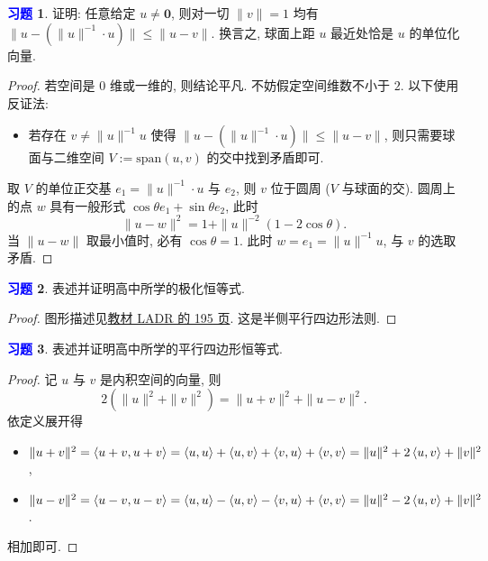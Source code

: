\documentclass[11pt]{ctexart}
\theoremstyle{definition}
\numberwithin{equation}{section}
\theoremstyle{definition}
\newtheorem{exercise}{\textcolor{blue}{习题}}
\theoremstyle{remark}
\begin{document}
\begin{exercise}
    证明: 任意给定 $u\neq \mathbf 0$, 则对一切 $\|v\|=1$ 均有 $\|u-(\|u\|^{-1}\cdot u)\|\leq \|u-v\|$. 换言之, 球面上距 $u$ 最近处恰是 $u$ 的单位化向量.
    \begin{proof}
        若空间是 $0$ 维或一维的, 则结论平凡. 不妨假定空间维数不小于 $2$. 以下使用反证法: 
        \begin{itemize}
            \item 若存在 $v\neq \|u\|^{-1}u$ 使得 $\|u-(\|u\|^{-1}\cdot u)\|\leq \|u-v\|$, 则只需要球面与二维空间 $V:=\mathrm{span}(u,v)$ 的交中找到矛盾即可.  
        \end{itemize}
        取 $V$ 的单位正交基 $e_1=\|u\|^{-1}\cdot u$ 与 $e_2$, 则 $v$ 位于圆周 ($V$ 与球面的交). 圆周上的点 $w$ 具有一般形式 $\cos\theta e_1+\sin \theta e_2$, 此时 
        \begin{equation}
            \|u-w\|^2= 1 + \|u\|^{-2}(1-2\cos\theta). 
        \end{equation}
        当 $\|u-w\|$ 取最小值时, 必有 $\cos\theta =1$. 此时 $w=e_1=\|u\|^{-1}u$, 与 $v$ 的选取矛盾. 
    \end{proof}
\end{exercise}

\begin{exercise}
    表述并证明高中所学的极化恒等式.
    \begin{proof}
        图形描述见\href{https://linear.axler.net/LADR4e.pdf#page=209}{教材 LADR 的 195 页}. 这是半侧平行四边形法则. 
    \end{proof}
\end{exercise}

\begin{exercise}
    表述并证明高中所学的平行四边形恒等式.
    \begin{proof}
        记 $u$ 与 $v$ 是内积空间的向量, 则
        \begin{equation}
            2(\|u\|^2+\|v\|^2)=\|u+v\|^2+\|u-v\|^2. 
        \end{equation}
        依定义展开得
        \begin{itemize}
            \item $\|u+v\|^2=\braket{u+v,u+v}=\braket{u,u}+ \braket{u,v}+\braket{v,u}+\braket{v,v}=\|u\|^2+2\braket{u,v}+\|v\|^2$,
            \item $\|u-v\|^2=\braket{u-v,u-v}=\braket{u,u}- \braket{u,v}-\braket{v,u}+\braket{v,v}=\|u\|^2-2\braket{u,v}+\|v\|^2$. 
        \end{itemize}
        相加即可. 
    \end{proof}
\end{exercise}
\end{document}
